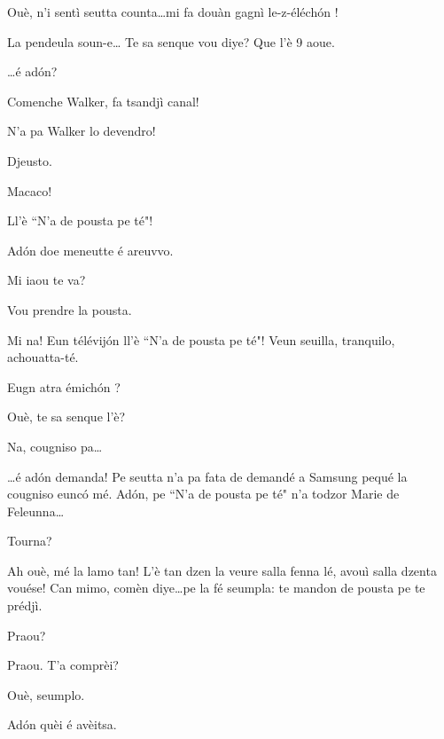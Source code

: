 \begin{drama}
\Vioupspeaks Ouè, n'i sentì seutta counta\ldots mi fa douàn  gagnì le-z-éléch\'on !



\Vioupspeaks La pendeula soun-e\ldots {} Te sa senque vou diye? Que l'è 9 aoue.

\Vioujspeaks \ldots é ad\'on?

\Vioupspeaks Comenche Walker, fa tsandjì canal! 

\Vioujspeaks N'a pa Walker lo devendro!

\Vioupspeaks Djeusto.

\Vioujspeaks Macaco!

\Vioupspeaks Ll'è ``N'a de pousta pe té"!


\Vioujspeaks Ad\'on doe meneutte é areuvvo.

\Vioupspeaks Mi iaou te va?

\Vioujspeaks Vou prendre la pousta.

\Vioupspeaks Mi na! Eun télévij\'on ll'è ``N'a de pousta pe té"! Veun seuilla, tranquilo, achouatta-té.


\Vioujspeaks Eugn atra émich\'on ?

\Vioupspeaks Ouè, te sa senque l'è?

\Vioujspeaks Na, cougniso pa\ldots

\Vioupspeaks \ldots é ad\'on demanda! Pe seutta n'a pa fata de demandé a Samsung pequé la cougniso eunc\'o mé. Ad\'on, pe ``N'a de pousta pe té" n'a todzor Marie de Feleunna\ldots

\Vioujspeaks Tourna?

\Vioupspeaks Ah ouè, mé la lamo tan! L'è tan dzen la veure salla fenna lé, avouì salla dzenta vouése! Can mimo, comèn diye\ldots pe la fé seumpla: te mandon de pousta pe te prédjì.

\Vioujspeaks Praou?

\Vioupspeaks Praou. T'a comprèi?

\Vioujspeaks Ouè, seumplo.

\Vioupspeaks Ad\'on quèi é avèitsa.



\scene[-- N'a de pousta pe té]


\end{drama}
